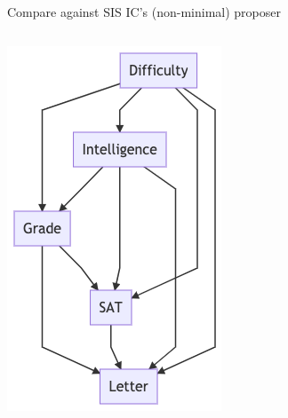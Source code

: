 \documentclass[12pt]{beamer}
\begin{document}
\begin{frame}{Compare against SIS IC's (non-minimal) proposer}
\begin{columns}
    \begin{column}{0.4\linewidth}
        \centering
        \includegraphics[width=\linewidth]{figures/student-network-smc-ic.png}
    \end{column}

\end{columns}
\end{frame}
\end{document}
